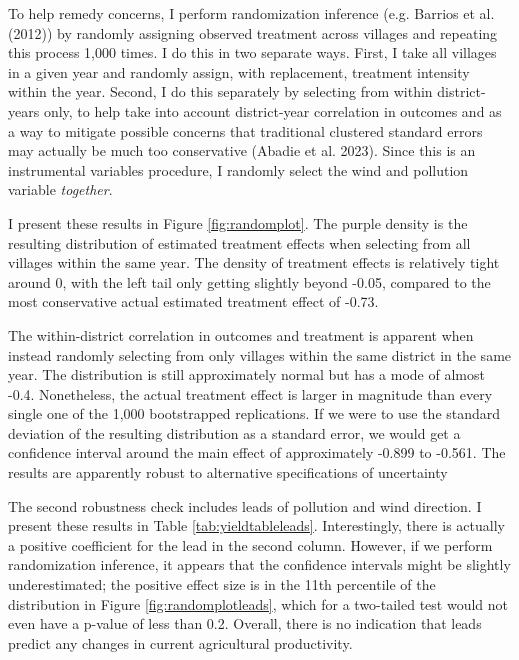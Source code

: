 \documentclass[
]{article}
\begin{document}
To help remedy concerns, I perform randomization inference (e.g. Barrios et al. (2012)) by randomly assigning observed treatment across villages and repeating this process 1,000 times. I do this in two separate ways. First, I take all villages in a given year and randomly assign, with replacement, treatment intensity within the year. Second, I do this separately by selecting from within district-years only, to help take into account district-year correlation in outcomes and as a way to mitigate possible concerns that traditional clustered standard errors may actually be much too conservative (Abadie et al. 2023). Since this is an instrumental variables procedure, I randomly select the wind and pollution variable \emph{together}.

I present these results in Figure \ref{fig:randomplot}. The purple density is the resulting distribution of estimated treatment effects when selecting from all villages within the same year. The density of treatment effects is relatively tight around 0, with the left tail only getting slightly beyond -0.05, compared to the most conservative actual estimated treatment effect of -0.73.

The within-district correlation in outcomes and treatment is apparent when instead randomly selecting from only villages within the same district in the same year. The distribution is still approximately normal but has a mode of almost -0.4. Nonetheless, the actual treatment effect is larger in magnitude than every single one of the 1,000 bootstrapped replications. If we were to use the standard deviation of the resulting distribution as a standard error, we would get a confidence interval around the main effect of approximately -0.899 to -0.561. The results are apparently robust to alternative specifications of uncertainty

The second robustness check includes leads of pollution and wind direction. I present these results in Table \ref{tab:yieldtableleads}. Interestingly, there is actually a positive coefficient for the lead in the second column. However, if we perform randomization inference, it appears that the confidence intervals might be slightly underestimated; the positive effect size is in the 11th percentile of the distribution in Figure \ref{fig:randomplotleads}, which for a two-tailed test would not even have a p-value of less than 0.2. Overall, there is no indication that leads predict any changes in current agricultural productivity.
\end{document}
